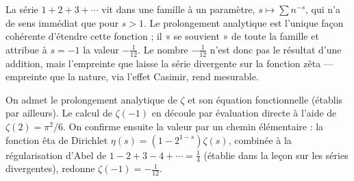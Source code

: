 \begin{significationintuitive}
La série $1+2+3+\cdots$ vit dans une famille à un paramètre, $s\mapsto\sum
n^{-s}$, qui n'a de sens immédiat que pour $s>1$. Le prolongement analytique est
l'unique façon cohérente d'étendre cette fonction ; il « se souvient » de toute
la famille et attribue à $s=-1$ la valeur $-\tfrac1{12}$. Le nombre $-\tfrac1{12}$
n'est donc pas le résultat d'une addition, mais l'empreinte que laisse la série
divergente sur la fonction zêta — empreinte que la nature, via l'effet Casimir,
rend mesurable.
\end{significationintuitive}

\decsep{}


\begin{ideepreuve}
On admet le prolongement analytique de $\zeta$ et son équation fonctionnelle
(établis par ailleurs). Le calcul de $\zeta(-1)$ en découle par évaluation
directe à l'aide de $\zeta(2)=\pi^2/6$. On confirme ensuite la valeur par un
chemin élémentaire : la fonction êta de Dirichlet $\eta(s)=(1-2^{1-s})\zeta(s)$,
combinée à la régularisation d'Abel de $1-2+3-4+\cdots=\tfrac14$ (établie dans
la leçon sur les séries divergentes), redonne $\zeta(-1)=-\tfrac1{12}$.
\end{ideepreuve}

\vspace{10pt}

